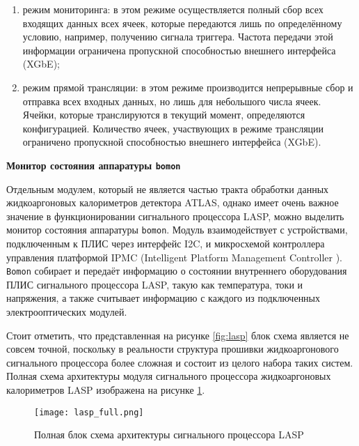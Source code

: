 \begin{enumerate}
    \item режим мониторинга: в этом режиме осуществляется полный сбор всех входящих данных всех ячеек, которые передаются лишь по определённому условию, например, получению сигнала триггера. Частота передачи этой информации ограничена пропускной способностью внешнего интерфейса (XGbE);
    \item режим прямой трансляции: в этом режиме производится непрерывные сбор и отправка всех входных данных, но лишь для небольшого числа ячеек. Ячейки, которые транслируются в текущий момент, определяются конфигурацией. Количество ячеек, участвующих в режиме трансляции ограничено пропускной способностью внешнего интерфейса (XGbE).
\end{enumerate}\par
\textbf{Монитор состояния аппаратуры \texttt{bomon}}\par
Отдельным модулем, который не является частью тракта обработки данных жидкоаргоновых калориметров детектора ATLAS, однако имеет очень важное значение в функционировании  сигнального процессора LASP, можно выделить монитор состояния аппаратуры \texttt{bomon}. Модуль взаимодействует с устройствами, подключенным к ПЛИС через интерфейс I2C, и микросхемой контроллера управления платформой IPMC (Intelligent Platform Management Controller \parencite{ipmc}). \texttt{Bomon} собирает и передаёт информацию о состоянии внутреннего оборудования ПЛИС сигнального процессора LASP, такую как температура, токи и напряжения, а также считывает информацию с каждого из подключенных электрооптических модулей.\par
Стоит отметить, что представленная на рисунке \ref{fig:lasp} блок схема является не совсем точной, поскольку в реальности структура прошивки жидкоаргонового сигнального процессора более сложная и состоит из целого набора таких систем. Полная схема архитектуры модуля сигнального процессора жидкоаргоновых калориметров LASP изображена на рисунке \ref{fig:lasp_full}.\par

\begin{figure}[ht]
    \centering
    \texttt{[image: lasp\_full.png]}
    \caption{Полная блок схема архитектуры сигнального процессора LASP}
    \label{fig:lasp_full}
\end{figure}\par

